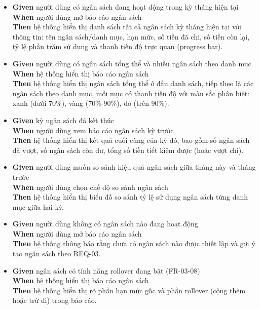 \begin{itemize}
\item \textbf{Given} người dùng có ngân sách đang hoạt động trong kỳ tháng hiện tại  \\ \hspace*{1.5em}  \textbf{When} người dùng mở báo cáo ngân sách  \\ \hspace*{1.5em}  \textbf{Then} hệ thống hiển thị danh sách tất cả ngân sách kỳ tháng hiện tại với thông tin: tên ngân sách/danh mục, hạn mức, số tiền đã chi, số tiền còn lại, tỷ lệ phần trăm sử dụng và thanh tiến độ trực quan (progress bar).
\item \textbf{Given} người dùng có ngân sách tổng thể và nhiều ngân sách theo danh mục  \\ \hspace*{1.5em}  \textbf{When} hệ thống hiển thị báo cáo ngân sách  \\ \hspace*{1.5em}  \textbf{Then} hệ thống hiển thị ngân sách tổng thể ở đầu danh sách, tiếp theo là các ngân sách theo danh mục, mỗi mục có thanh tiến độ với màu sắc phân biệt: xanh (dưới 70\%), vàng (70\%-90\%), đỏ (trên 90\%).
\item \textbf{Given} kỳ ngân sách đã kết thúc  \\ \hspace*{1.5em}  \textbf{When} người dùng xem báo cáo ngân sách kỳ trước  \\ \hspace*{1.5em}  \textbf{Then} hệ thống hiển thị kết quả cuối cùng của kỳ đó, bao gồm số ngân sách đã vượt, số ngân sách còn dư, tổng số tiền tiết kiệm được (hoặc vượt chi).
\item \textbf{Given} người dùng muốn so sánh hiệu quả ngân sách giữa tháng này và tháng trước  \\ \hspace*{1.5em}  \textbf{When} người dùng chọn chế độ so sánh ngân sách  \\ \hspace*{1.5em}  \textbf{Then} hệ thống hiển thị biểu đồ so sánh tỷ lệ sử dụng ngân sách từng danh mục giữa hai kỳ.
\item \textbf{Given} người dùng không có ngân sách nào đang hoạt động  \\ \hspace*{1.5em}  \textbf{When} người dùng mở báo cáo ngân sách  \\ \hspace*{1.5em}  \textbf{Then} hệ thống thông báo rằng chưa có ngân sách nào được thiết lập và gợi ý tạo ngân sách theo REQ-03.
\item \textbf{Given} ngân sách có tính năng rollover đang bật (FR-03-08)  \\ \hspace*{1.5em}  \textbf{When} hệ thống hiển thị báo cáo ngân sách  \\ \hspace*{1.5em}  \textbf{Then} hệ thống hiển thị rõ phần hạn mức gốc và phần rollover (cộng thêm hoặc trừ đi) trong báo cáo.
\end{itemize}
